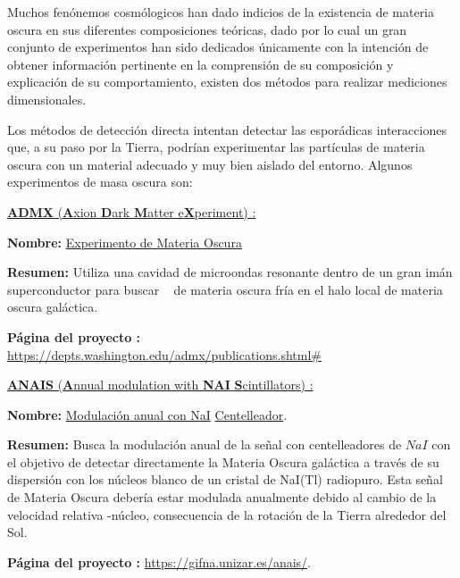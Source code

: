 Muchos fenónemos cosmólogicos han dado indicios de la existencia de materia oscura en sus diferentes composiciones teóricas, dado por lo cual un gran conjunto de experimentos han sido dedicados únicamente con la intención de obtener información pertinente en la comprensión de su composición y explicación de su comportamiento, existen dos métodos para realizar mediciones dimensionales.%

Los métodos de detección directa intentan detectar las esporádicas interacciones que, a su paso por la Tierra, podrían experimentar
las partículas de materia oscura con un material adecuado y muy bien aislado del entorno.%
Algunos experimentos de masa oscura son:

\href{https://en.wikipedia.org/wiki/Axion_Dark_Matter_Experiment}{ \textbf{ADMX} (\textbf{A}xion \textbf{D}ark \textbf{M}atter e\textbf{X}periment) :} 
\begin{itemize_f}
\item \textbf{Nombre:} \href{https://en.wikipedia.org/wiki/Axion_Dark_Matter_Experiment}{Experimento de Materia Oscura \Axion}
\item \textbf{Resumen:} Utiliza una cavidad de microondas resonante dentro de un gran imán superconductor para buscar \axiones~ de materia oscura fría en el halo local de materia oscura galáctica. 
\item \textbf{Página del proyecto :} \href{https://depts.washington.edu/admx/publications.shtml\#}{https://depts.washington.edu/admx/publications.shtml\#}
\end{itemize_f}

\href{https://en.wikipedia.org/wiki/ANAIS}{\textbf{ANAIS} (\textbf{A}nnual modulation with \textbf{NAI} \textbf{S}cintillators) :} 
\begin{itemize_f}
\item \textbf{Nombre:} \href{https://en.wikipedia.org/wiki/ANAIS}{Modulación anual con NaI} \href{https://es.wikipedia.org/wiki/Centelleador}{Centelleador}.
\item \textbf{Resumen:} Busca la modulación anual de la señal con centelleadores de \href{https://es.wikipedia.org/wiki/Yoduro_de_sodio}{$NaI$} con el objetivo de detectar directamente  la Materia Oscura galáctica a través de su dispersión con los núcleos blanco de un cristal de NaI(Tl) radiopuro. Esta señal de Materia Oscura debería estar modulada anualmente debido al cambio de la velocidad relativa \WIMP-núcleo, consecuencia de la rotación de la Tierra alrededor del Sol.
\item \textbf{Página del proyecto :} \href{https://gifna.unizar.es/anais/}{https://gifna.unizar.es/anais/}.
\end{itemize_f}


